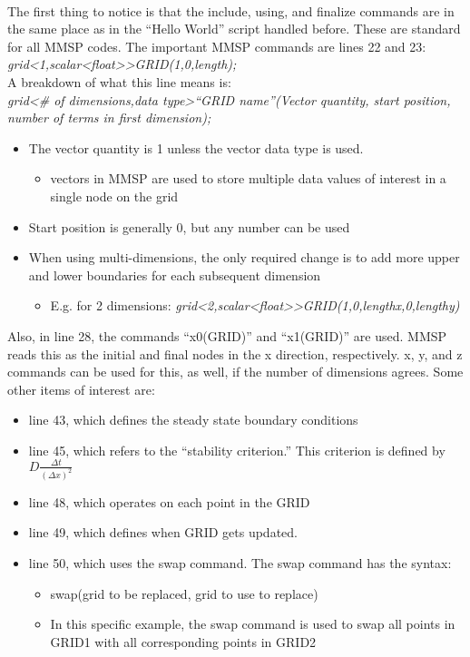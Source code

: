 \documentclass{article}
\begin{document}
\\The first thing to notice is that the include, using, and finalize commands are in the same place as in the “Hello World” script handled before.  These are standard for all MMSP codes.  The important MMSP commands are lines 22 and 23:
\\ 	\textit{grid\textless 1,scalar\textless float\textgreater \textgreater GRID(1,0,length);}
\\A breakdown of what this line means is:
\\ 	\textit{grid\textless \# of dimensions,data type\textgreater “GRID name”(Vector quantity, start position, number of terms in first dimension);}
\\ \begin{itemize} \itemsep1pt \parskip0pt 
\item The vector quantity is 1 unless the vector data type is used.
\begin{itemize} \itemsep1pt \parskip0pt 
\item vectors in MMSP are used to store multiple data values of interest in a single node on the grid
\end{itemize}
\item Start position is generally 0, but any number can be used
\item When using multi-dimensions, the only required change is to add more upper and lower boundaries for each subsequent dimension
\begin{itemize} \itemsep1pt \parskip0pt 
\item E.g. for 2 dimensions: \textit{grid\textless 2,scalar\textless float\textgreater \textgreater GRID(1,0,lengthx,0,lengthy)}
\end{itemize}
\end{itemize}
Also, in line 28, the commands “x0(GRID)” and “x1(GRID)” are used. MMSP reads this as the initial and final nodes in the x direction, respectively. x, y, and z commands can be used for this, as well, if the number of dimensions agrees.
Some other items of interest are:
\begin{itemize} \itemsep1pt \parskip0pt 
\item line 43, which defines the steady state boundary conditions
\item line 45, which refers to the “stability criterion.” This criterion is defined by $D\frac{\Delta t}{(\Delta x)^2}$
\item line 48, which operates on each point in the GRID
\item line 49, which defines when GRID gets updated.
\item line 50, which uses the swap command. The swap command has the syntax:
\begin{itemize} \itemsep1pt \parskip0pt 
\item swap(grid to be replaced, grid to use to replace)
\item In this specific example, the swap command is used to swap all points in GRID1 with all corresponding points in GRID2
\end{itemize}
\end{itemize}
\end{document}
